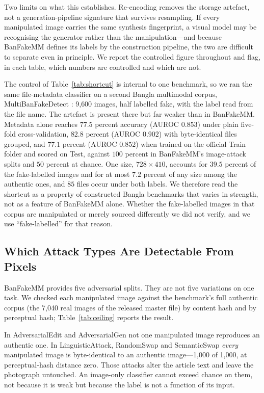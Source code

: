 \documentclass[journal]{IEEEtran}
\begin{document}
Two limits on what this establishes. Re-encoding removes the storage artefact,
not a generation-pipeline signature that survives resampling. If every
manipulated image carries the same synthesis fingerprint, a visual model may be
recognising the generator rather than the manipulation---and because BanFakeMM
defines its labels by the construction pipeline, the two are difficult to
separate even in principle. We report the controlled figure throughout and
flag, in each table, which numbers are controlled and which are not.

The control of Table~\ref{tab:shortcut} is internal to one benchmark, so we ran
the same file-metadata classifier on a second Bangla multimodal corpus,
MultiBanFakeDetect \cite{multibanfake}: 9{,}600 images, half labelled fake,
with the label read from the file name. The artefact is present there but far
weaker than in BanFakeMM. Metadata alone reaches $77.5$ percent accuracy
(AUROC $0.853$) under plain five-fold cross-validation, $82.8$ percent
(AUROC $0.902$) with byte-identical files grouped, and $77.1$ percent
(AUROC $0.852$) when trained on the official Train folder and scored on Test,
against $100$ percent in BanFakeMM's image-attack splits and $50$ percent at
chance. One size, $728\times410$, accounts for $39.5$ percent of the
fake-labelled images and for at most $7.2$ percent of any size among the
authentic ones, and $85$ files occur under both labels. We therefore read the
shortcut as a property of constructed Bangla benchmarks that varies in
strength, not as a feature of BanFakeMM alone. Whether the fake-labelled images
in that corpus are manipulated or merely sourced differently we did not
verify, and we use ``fake-labelled'' for that reason.

\subsection{Which Attack Types Are Detectable From Pixels}
\label{sec:detectable}

BanFakeMM provides five adversarial splits. They are not five variations on
one task. We checked each manipulated image against the benchmark's full
authentic corpus (the 7{,}040 real images of the released master file) by
content hash and by perceptual hash; Table~\ref{tab:ceiling} reports the
result.

In AdversarialEdit and AdversarialGen not one manipulated image reproduces an
authentic one. In LinguisticAttack, RandomSwap and SemanticSwap \emph{every}
manipulated image is byte-identical to an authentic image---1{,}000 of 1{,}000,
at perceptual-hash distance zero. Those attacks alter the article text and
leave the photograph untouched. An image-only classifier cannot exceed chance
on them, not because it is weak but because the label is not a function of its
input.
\end{document}
